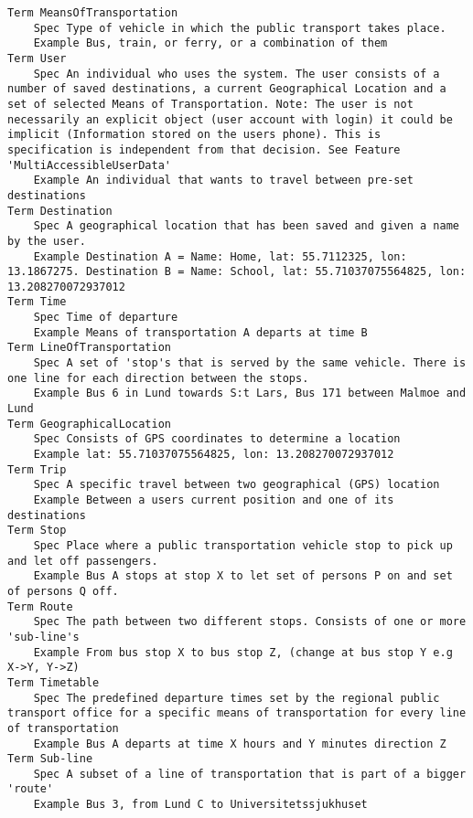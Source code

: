 

\begin{lstlisting}
Term MeansOfTransportation
	Spec Type of vehicle in which the public transport takes place.
	Example Bus, train, or ferry, or a combination of them
Term User
	Spec An individual who uses the system. The user consists of a number of saved destinations, a current Geographical Location and a set of selected Means of Transportation. Note: The user is not necessarily an explicit object (user account with login) it could be implicit (Information stored on the users phone). This is specification is independent from that decision. See Feature 'MultiAccessibleUserData'
	Example An individual that wants to travel between pre-set destinations
Term Destination
	Spec A geographical location that has been saved and given a name by the user.
	Example Destination A = Name: Home, lat: 55.7112325, lon: 13.1867275. Destination B = Name: School, lat: 55.71037075564825, lon: 13.208270072937012
Term Time
	Spec Time of departure
	Example Means of transportation A departs at time B
Term LineOfTransportation
	Spec A set of 'stop's that is served by the same vehicle. There is one line for each direction between the stops.
	Example Bus 6 in Lund towards S:t Lars, Bus 171 between Malmoe and Lund
Term GeographicalLocation
	Spec Consists of GPS coordinates to determine a location
	Example lat: 55.71037075564825, lon: 13.208270072937012
Term Trip
	Spec A specific travel between two geographical (GPS) location
	Example Between a users current position and one of its destinations
Term Stop
	Spec Place where a public transportation vehicle stop to pick up and let off passengers.
	Example Bus A stops at stop X to let set of persons P on and set of persons Q off.
Term Route
	Spec The path between two different stops. Consists of one or more 'sub-line's
	Example From bus stop X to bus stop Z, (change at bus stop Y e.g X->Y, Y->Z)
Term Timetable
	Spec The predefined departure times set by the regional public transport office for a specific means of transportation for every line of transportation
	Example Bus A departs at time X hours and Y minutes direction Z
Term Sub-line
	Spec A subset of a line of transportation that is part of a bigger 'route'
	Example Bus 3, from Lund C to Universitetssjukhuset

\end{lstlisting}
